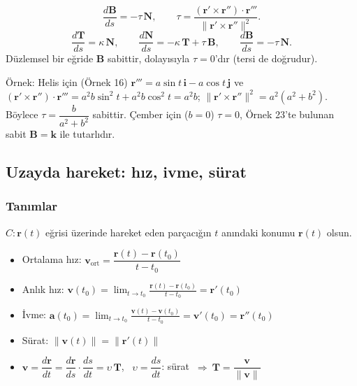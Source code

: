 \begin{teorem}
\[ \frac{d\mathbf B}{ds}=-\tau\,\mathbf N,\qquad \tau=\frac{(\mathbf r'\times\mathbf r'')\cdot\mathbf r'''}{\|\mathbf r'\times\mathbf r''\|^2} . \]
\[ \frac{d\mathbf T}{ds}=\kappa\,\mathbf N,\qquad \frac{d\mathbf N}{ds}=-\kappa\,\mathbf T+\tau\,\mathbf B,\qquad \frac{d\mathbf B}{ds}=-\tau\,\mathbf N . \]
Düzlemsel bir eğride $\mathbf B$ sabittir, dolayısıyla $\tau=0$'dır (tersi de doğrudur).
\end{teorem}

Örnek: Helis için (Örnek 16) $\mathbf r'''=a\sin t\,\mathbf i-a\cos t\,\mathbf j$ ve
$(\mathbf r'\times\mathbf r'')\cdot\mathbf r'''=a^2b\sin^2t+a^2b\cos^2t=a^2b$; $\|\mathbf r'\times\mathbf r''\|^2=a^2(a^2+b^2)$. Böylece
$\tau=\dfrac{b}{a^2+b^2}$ sabittir. Çember için ($b=0$) $\tau=0$, Örnek 23'te bulunan sabit $\mathbf B=\mathbf k$ ile tutarlıdır.

\subsection{Uzayda hareket: hız, ivme, sürat}

\subsubsection{Tanımlar}

\begin{tahta}
$C:\mathbf r(t)$ eğrisi üzerinde hareket eden parçacığın $t$ anındaki konumu $\mathbf r(t)$ olsun.
\begin{itemize}
\item Ortalama hız: $\mathbf v_{\text{ort}}=\dfrac{\mathbf r(t)-\mathbf r(t_0)}{t-t_0}$
\item Anlık hız: $\mathbf v(t_0)=\displaystyle\lim_{t\to t_0}\frac{\mathbf r(t)-\mathbf r(t_0)}{t-t_0}=\mathbf r'(t_0)$
\item İvme: $\mathbf a(t_0)=\displaystyle\lim_{t\to t_0}\frac{\mathbf v(t)-\mathbf v(t_0)}{t-t_0}=\mathbf v'(t_0)=\mathbf r''(t_0)$
\item Sürat: $\|\mathbf v(t)\|=\|\mathbf r'(t)\|$
\item $\mathbf v=\dfrac{d\mathbf r}{dt}=\dfrac{d\mathbf r}{ds}\cdot\dfrac{ds}{dt}=\upsilon\,\mathbf T$, \ $\upsilon=\dfrac{ds}{dt}$: sürat $\ \Rightarrow\ \mathbf T=\dfrac{\mathbf v}{\|\mathbf v\|}$
\end{itemize}
\end{tahta}


